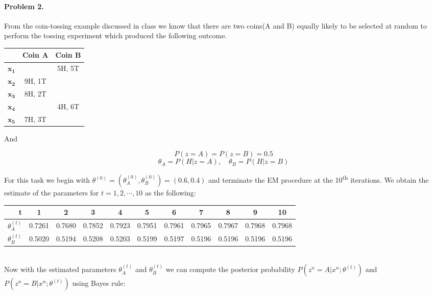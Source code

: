 \documentclass[a4paper]{article}
\begin{document}
\paragraph{Problem 2.} From the coin-tossing example discussed in class we know that there are two coins(A and B) equally likely to be selected at random to perform the tossing experiment which produced the following outcome. \\

\begin{center}
  \begin{tabular}{  r | c | c }
                 & Coin A & Coin B \\ \hline
    $\mathbf{x_1}$ &        & 5H, 5T \\ 
    $\mathbf{x_2}$ & 9H, 1T &        \\ 
    $\mathbf{x_3}$ & 8H, 2T &        \\ 
    $\mathbf{x_4}$ &        & 4H, 6T \\ 
    $\mathbf{x_5}$ & 7H, 3T &        
  \end{tabular}
\end{center}

And

$$ P(z = A) = P(z = B) = 0.5 $$
$$ \theta_A = P(H|z=A), \quad \theta_B = P(H|z=B)  $$

For this task we begin with $\theta^{(0)} = (\theta^{(0)}_A, \theta^{(0)}_B) = (0.6, 0.4)$ and terminate the EM procedure at the 10\textsuperscript{th} iterations. We obtain the estimate of the parameters for $t = 1,2,\cdots,10$ as the following: \\

\begin{tabular}{ | r | c c c c c c c c c c | }
	\hline
	t & 1 & 2 & 3 & 4 & 5 & 6 & 7 & 8 & 9 & 10 \\ \hline
	$\theta_A^{(t)}$ & 0.7261  &  0.7680  &  0.7852  &  0.7923  &  0.7951  &  0.7961  &  0.7965  &  0.7967  &  0.7968  &  0.7968 \\
	$\theta_B^{(t)}$ & 0.5020  &  0.5194  &  0.5208  &  0.5203  &  0.5199  &  0.5197  &  0.5196  &  0.5196  &  0.5196  &  0.5196 \\ \hline
\end{tabular}

~\\

Now with the estimated parameters $\theta_A^{(t)}$ and $\theta_B^{(t)}$ we can compute the posterior probability $P(z^n = A|x^n; \theta^{(t)})$ and $P(z^n = B|x^n; \theta^{(t)})$ using Bayes rule:
\end{document}
